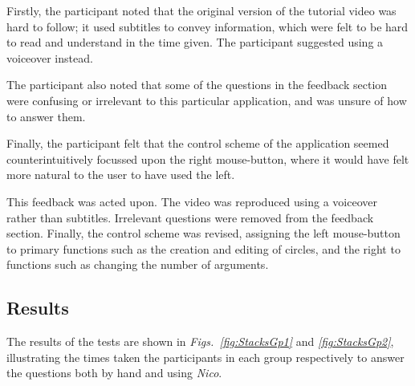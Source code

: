 \documentclass[12pt,twoside,notitlepage,xetex]{report}
\begin{document}
Firstly, the participant noted that the original version of the tutorial video was hard to follow; it used subtitles to convey information, which were felt to be hard to read and understand in the time given.  The participant suggested using a voiceover instead.

The participant also noted that some of the questions in the feedback section were confusing or irrelevant to this particular application, and was unsure of how to answer them.

Finally, the participant felt that the control scheme of the application seemed counterintuitively focussed upon the right mouse-button, where it would have felt more natural to the user to have used the left.

This feedback was acted upon.  The video was reproduced using a voiceover rather than subtitles.  Irrelevant questions were removed from the feedback section.  Finally, the control scheme was revised, assigning the left mouse-button to primary functions such as the creation and editing of circles, and the right to functions such as changing the number of arguments.

\subsection{Results}

The results of the tests are shown in \emph{Figs.~\ref{fig:StacksGp1}} and \emph{\ref{fig:StacksGp2}}, illustrating the times taken the participants in each group respectively to answer the questions both by hand and using \emph{Nico}.
\end{document}
